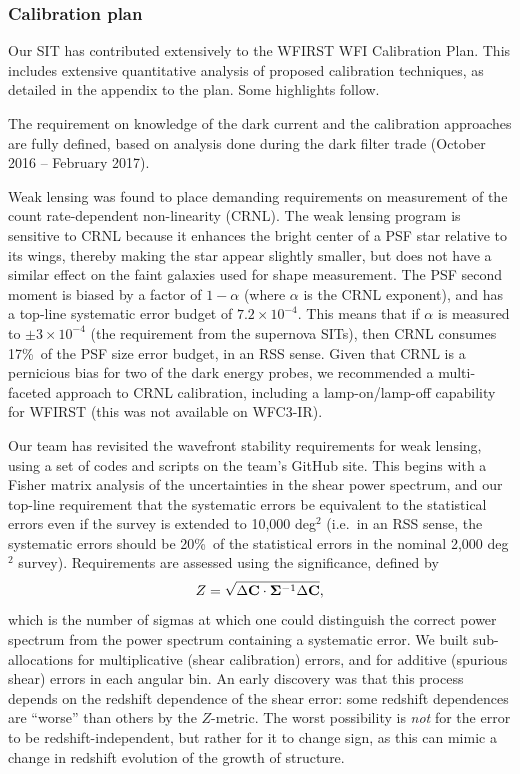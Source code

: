 \subsubsection{Calibration plan}

Our SIT has contributed extensively to the WFIRST WFI Calibration Plan. This includes extensive quantitative analysis of proposed calibration techniques, as detailed in the appendix to the plan. Some highlights follow.

The requirement on knowledge of the dark current and the calibration approaches are fully defined, based on analysis done during the dark filter trade (October 2016 -- February 2017).

Weak lensing was found to place demanding requirements on measurement of the count rate-dependent non-linearity (CRNL). The weak lensing program is sensitive to CRNL because it enhances the bright center of a PSF star relative to its wings, thereby making the star appear slightly smaller, but does not have a similar effect on the faint galaxies used for shape measurement. The PSF second moment is biased by a factor of $1-\alpha$ (where $\alpha$ is the CRNL exponent), and has a top-line systematic error budget of $7.2\times 10^{-4}$. This means that if $\alpha$ is measured to $\pm 3\times 10^{-4}$ (the requirement from the supernova SITs), then CRNL consumes 17\%\ of the PSF size error budget, in an RSS sense. Given that CRNL is a pernicious bias for two of the dark energy probes, we recommended a multi-faceted approach to CRNL calibration, including a lamp-on/lamp-off capability for WFIRST (this was not available on WFC3-IR).

Our team has revisited the wavefront stability requirements for weak lensing, using a set of codes and scripts on the team's GitHub site. This begins with a Fisher matrix analysis of the uncertainties in the shear power spectrum, and our top-line requirement that the systematic errors be equivalent to the statistical errors even if the survey is extended to 10,000 deg$^2$ (i.e.\ in an RSS sense, the systematic errors should be 20\%\ of the statistical errors in the nominal 2,000 deg$^2$ survey). Requirements are assessed using the significance, defined by
\begin{equation}
Z = \sqrt{\Delta{\bf C}\cdot{\bf\Sigma}^{-1}\Delta{\bf C}},
\label{eq:alpha}
\end{equation}
which is the number of sigmas at which one could distinguish the correct power spectrum from the power spectrum containing a systematic error. We built sub-allocations for multiplicative (shear calibration) errors, and for additive (spurious shear) errors in each angular bin. An early discovery was that this process depends on the redshift dependence of the shear error: some redshift dependences are ``worse'' than others by the $Z$-metric. The worst possibility is {\em not} for the error to be redshift-independent, but rather for it to change sign, as this can mimic a change in redshift evolution of the growth of structure.

